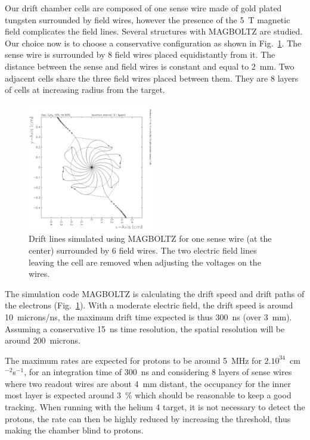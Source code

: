 Our drift chamber cells are composed of one sense wire made of gold plated 
tungsten surrounded by field wires, however the presence of the 5~T magnetic 
field complicates the field lines. Several structures with MAGBOLTZ 
\cite{Magboltz} are studied. Our choice now is to choose a conservative 
configuration as shown in Fig.~\ref{fig:drift_cell}. The sense wire is 
surrounded by 8 field wires placed equidistantly from it. The distance between 
the sense and field wires is constant and equal to 2~mm. Two adjacent cells 
share the three field wires placed between them. They are 8 layers of cells at 
increasing radius from the target. \\

\begin{figure}
  \begin{center}
    \includegraphics[angle=0, width=0.5\textwidth]{./../Detector/fig-chap2/HEISOE.pdf}
    \caption{Drift lines simulated using MAGBOLTZ \cite{Magboltz} for one sense wire (at the center) surrounded by 6 field wires. The two electric field lines leaving the cell are removed when adjusting the voltages on the wires.}
    \label{fig:drift_cell}
  \end{center}
\end{figure}

The simulation code MAGBOLTZ is calculating the drift speed and drift paths of 
the electrons (Fig.~\ref{fig:drift_cell}). With a moderate electric field, the 
drift speed is around 10~microns/ns, the maximum drift time expected is thus 
300~ns (over 3~mm). Assuming a conservative 15~ns time resolution, the spatial 
resolution will be around 200~microns. 

The maximum rates are expected for protons to be around 5~MHz for $2.10^{34}$~cm$^{-2}$s$^{-1}$, for an integration time of 300~ns and considering 8 layers of sense wires where two readout wires are about 4~mm distant, the occupancy for the inner most layer is expected around 3~\% which should be reasonable to keep a good tracking. When running with the helium 4 target, it is not necessary to detect the protons, the rate can then be highly reduced by increasing the threshold, thus making the chamber blind to protons. \\

